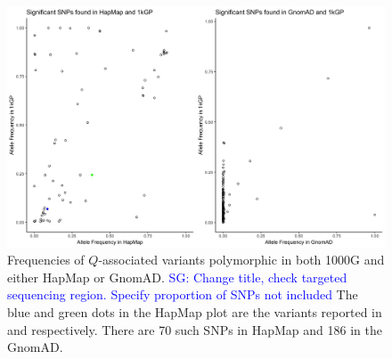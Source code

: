 \documentclass[9pt,lineno]{elife}
\newcommand{\sgcomment}[1]{\textcolor{blue}{SG: #1}}
\begin{document}
\begin{figure}[h]
\includegraphics[width=\hsize,keepaspectratio]{./Figures/Hap_GnomAD.jpg}
\caption{Frequencies of $Q$-associated variants polymorphic in both 1000G and either HapMap or GnomAD. \sgcomment{Change title, check targeted  sequencing region. Specify proportion of SNPs not included} The blue and green dots in the HapMap plot are the variants reported in \citep{Mandage2017} and \citep{Kraja2011} respectively. There are 70 such SNPs in HapMap and 186 in the GnomAD.}
\label{HapMap_GnomAD}
\end{figure}
\end{document}
